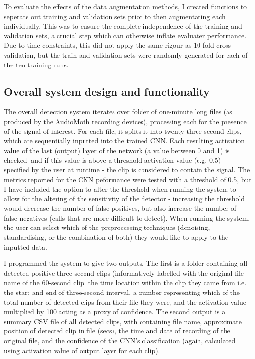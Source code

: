 \documentclass[11pt]{article}
\begin{document}
To evaluate the effects of the data augmentation methods, I created functions to seperate out training and validation sets prior to then augmentating each individually. This was to ensure the complete independence of the training and validation sets, a crucial step which can otherwise inflate evaluater performance. Due to time constraints, this did not apply the same rigour as 10-fold cross-validation, but the train and validation sets were randomly generated for each of the ten training runs. 

\subsection{Overall system design and functionality}

The overall detection system iterates over folder of one-minute long files (as produced by the AudioMoth recording devices), processing each for the presence of the signal of interest. For each file, it splits it into twenty three-second clips, which are sequentially inputted into the trained CNN. Each resulting activation value of the last (output) layer of the network (a value between 0 and 1) is checked, and if this value is above a threshold activation value (e.g. 0.5) - specified by the user at runtime - the clip is considered to contain the signal. The metrics reported for the CNN peformance were tested with a threshold of 0.5, but I have included the option to alter the threshold when running the system to allow for the altering of the sensitivity of the detector - increasing the threshold would decrease the number of false positives, but also increase the number of false negatives (calls that are more difficult to detect). When running the system, the user can select which of the preprocessing techniques (denoising, standardising, or the combination of both) they would like to apply to the inputted data.

I programmed the system to give two outputs. The first is a folder containing all detected-positive three second clips (informatively labelled with the original file name of the 60-second clip, the time location within the clip they came from i.e. the start and end of three-second interval, a number representing which of the total number of detected clips from their file they were, and the activation value multiplied by 100 acting as a proxy of confidence. The second output is a summary CSV file of all detected clips, with containing file name, approximate position of detected clip in file (secs), the time and date of recording of the original file, and the confidence of the CNN's classification (again, calculated using activation value of output layer for each clip). 
\end{document}
